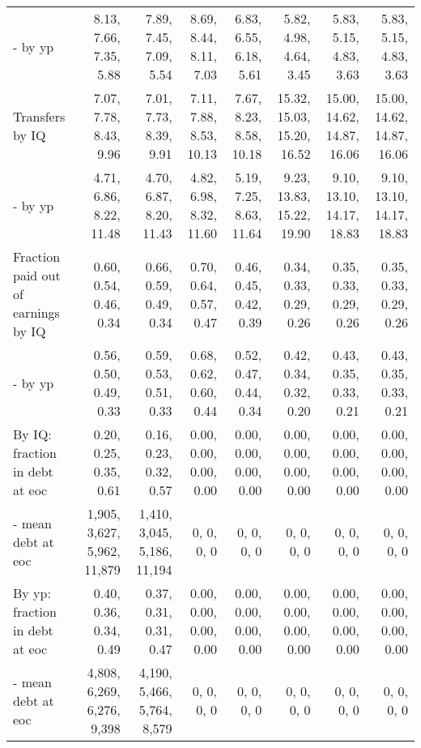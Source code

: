 \begin{tabular}{lrrrrrrr}
- by yp & 8.13, 7.66, 7.35, 5.88  & 7.89, 7.45, 7.09, 5.54  & 8.69, 8.44, 8.11, 7.03  & 6.83, 6.55, 6.18, 5.61  & 5.82, 4.98, 4.64, 3.45  & 5.83, 5.15, 4.83, 3.63  & 5.83, 5.15, 4.83, 3.63  \\ 
Transfers by IQ & 7.07, 7.78, 8.43, 9.96  & 7.01, 7.73, 8.39, 9.91  & 7.11, 7.88, 8.53, 10.13  & 7.67, 8.23, 8.58, 10.18  & 15.32, 15.03, 15.20, 16.52  & 15.00, 14.62, 14.87, 16.06  & 15.00, 14.62, 14.87, 16.06  \\ 
- by yp & 4.71, 6.86, 8.22, 11.48  & 4.70, 6.87, 8.20, 11.43  & 4.82, 6.98, 8.32, 11.60  & 5.19, 7.25, 8.63, 11.64  & 9.23, 13.83, 15.22, 19.90  & 9.10, 13.10, 14.17, 18.83  & 9.10, 13.10, 14.17, 18.83  \\ 
Fraction paid out of earnings by IQ & 0.60, 0.54, 0.46, 0.34  & 0.66, 0.59, 0.49, 0.34  & 0.70, 0.64, 0.57, 0.47  & 0.46, 0.45, 0.42, 0.39  & 0.34, 0.33, 0.29, 0.26  & 0.35, 0.33, 0.29, 0.26  & 0.35, 0.33, 0.29, 0.26  \\ 
- by yp & 0.56, 0.50, 0.49, 0.33  & 0.59, 0.53, 0.51, 0.33  & 0.68, 0.62, 0.60, 0.44  & 0.52, 0.47, 0.44, 0.34  & 0.42, 0.34, 0.32, 0.20  & 0.43, 0.35, 0.33, 0.21  & 0.43, 0.35, 0.33, 0.21  \\ 
By IQ: fraction in debt at eoc & 0.20, 0.25, 0.35, 0.61  & 0.16, 0.23, 0.32, 0.57  & 0.00, 0.00, 0.00, 0.00  & 0.00, 0.00, 0.00, 0.00  & 0.00, 0.00, 0.00, 0.00  & 0.00, 0.00, 0.00, 0.00  & 0.00, 0.00, 0.00, 0.00  \\ 
- mean debt at eoc & 1,905, 3,627, 5,962, 11,879  & 1,410, 3,045, 5,186, 11,194  & 0, 0, 0, 0  & 0, 0, 0, 0  & 0, 0, 0, 0  & 0, 0, 0, 0  & 0, 0, 0, 0  \\ 
By yp: fraction in debt at eoc & 0.40, 0.36, 0.34, 0.49  & 0.37, 0.31, 0.31, 0.47  & 0.00, 0.00, 0.00, 0.00  & 0.00, 0.00, 0.00, 0.00  & 0.00, 0.00, 0.00, 0.00  & 0.00, 0.00, 0.00, 0.00  & 0.00, 0.00, 0.00, 0.00  \\ 
- mean debt at eoc & 4,808, 6,269, 6,276, 9,398  & 4,190, 5,466, 5,764, 8,579  & 0, 0, 0, 0  & 0, 0, 0, 0  & 0, 0, 0, 0  & 0, 0, 0, 0  & 0, 0, 0, 0  \\ 
\hline
\end{tabular}%
